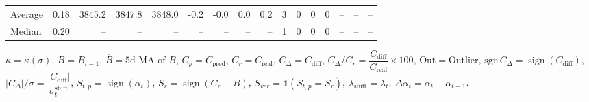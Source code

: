 \begin{threeparttable}
{\begin{tabular}{lrrrrrrrrrrrrrrr}
Average &     0.18 & 3845.2 & 3847.8 & 3848.0 &       -0.2 &           -0.0 &                      0.0 &                 0.2 &              3 &         0 &     0 &         0 &         -- &        -- &             -- \\
 Median &     0.20 &     -- &     -- &     -- &         -- &             -- &                       -- &                  -- &              1 &         0 &     0 &         0 &         -- &        -- &             -- \\
\bottomrule
\end{tabular}
}
\begin{tablenotes}\footnotesize
\item $\kappa=\kappa(\sigma)$, $B=B_{t-1}$, $\overline{B}=\text{5d MA of }B$, $C_p=C_{\text{pred}}$, $C_r=C_{\text{real}}$, $C_\Delta=C_{\text{diff}}$, $C_\Delta/C_r=\dfrac{C_{\text{diff}}}{C_{\text{real}}}\times100$, $\mathrm{Out}=\text{Outlier}$, $\mathrm{sgn}\,C_\Delta=\operatorname{sign}(C_{\text{diff}})$, $|C_\Delta|/\sigma=\dfrac{|C_{\text{diff}}|}{\sigma_t^{\text{shift}}}$, $S_{t,p}=\operatorname{sign}(\alpha_t)$, $S_r=\operatorname{sign}(C_r - B)$, $S_{ver}=\mathbb{1}(S_{t,p}=S_r)$, $\lambda_{\text{shift}}=\lambda_t$, $\Delta\alpha_t=\alpha_t-\alpha_{t-1}$.\end{tablenotes}
\end{threeparttable}
\endgroup


